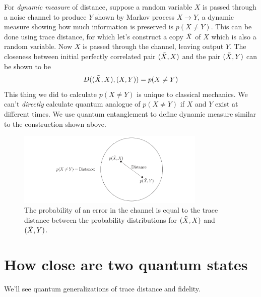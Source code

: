 For \textit{dynamic measure} of distance, suppose a random variable $X$ is passed through a noise channel to produce $Y$ shown by Markov process $X\longrightarrow Y$, a dynamic measure showing how much information is preserved is $p(X\neq Y)$. This can be done using trace distance, for which let's construct a copy $\Tilde{X}$ of $X$ which is also a random variable. Now $X$ is passed through the channel, leaving output $Y$. The closeness between initial perfectly correlated pair $(\Tilde{X}, X)$ and the pair $(\Tilde{X}, Y)$ can be shown to be
\begin{equation}
    D((\Tilde{X},X), (X, Y)) = p(X\neq Y)
\end{equation}
This thing we did to calculate $p(X\neq Y)$ is unique to classical mechanics. We can't \textit{directly} calculate quantum analogue of $p(X\neq Y)$ if $X$ and $Y$ exist at different times. We use quantum entanglement to define dynamic measure similar to the construction shown above. 
\begin{figure}[H]
    \centering
    \includegraphics[width=0.8\textwidth]{images/dynamic_measure.png}
    \caption{The probability of an error in the channel is equal to the trace distance between the probability distributions for $( \Tilde{X}, X)$ and $( \Tilde{X}, Y )$.}
    \label{fig:enter-label}
\end{figure}

\section{How close are two quantum states}
We'll see quantum generalizations of trace distance and fidelity.
